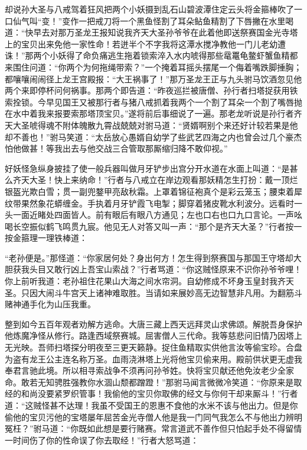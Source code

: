 \documentclass[12pt,UTF8]{ctexbook}
\begin{document}
却说孙大圣与八戒驾着狂风把两个小妖摄到乱石山碧波潭住定云头将金箍棒吹了一口仙气叫“变！”变作一把戒刀将一个黑鱼怪割了耳朵鲇鱼精割了下唇撇在水里喝道：“快早去对那万圣龙王报知说我齐天大圣孙爷爷在此着他即送祭赛国金光寺塔上的宝贝出来免他一家性命！若迸半个不字我将这潭水搅净教他一门儿老幼遭诛！”那两个小妖得了命负痛逃生拖着锁索淬入水内唬得那些鼋鼍龟鳖虾蟹鱼精都来围住问道：“你两个为何拖绳带索？”一个掩着耳摇头摆尾一个侮着嘴跌脚捶胸；都嚷嚷闹闹径上龙王宫殿报：“大王祸事了！”那万圣龙王正与九头驸马饮酒忽见他两个来即停杯问何祸事。那两个即告道：“昨夜巡拦被唐僧、孙行者扫塔捉获用铁索拴锁。今早见国王又被那行者与猪八戒抓着我两个一个割了耳朵一个割了嘴唇抛在水中着我来报要索那塔顶宝贝。”遂将前后事细说了一遍。那老龙听说是孙行者齐天大圣唬得魂不附体魄散九霄战兢兢对驸马道：“贤婿啊别个来还好计较若果是他却不善也！”驸马笑道：“太岳放心愚婿自幼学了些武艺四海之内也曾会过几个豪杰怕他做甚！等我出去与他交战三合管取那厮缩归降不敢仰视。”

好妖怪急纵身披挂了使一般兵器叫做月牙铲步出宫分开水道在水面上叫道：“是甚么齐天大圣！快上来纳命！”行者与八戒立在岸边观看那妖精怎生打扮：戴一顶烂银盔光欺白雪；贯一副兜鍪甲亮敌秋霜。上罩着锦征袍真个是彩云笼玉；腰束着犀纹带果然象花蟒缠金。手执着月牙铲霞飞电掣；脚穿着猪皮靴水利波分。远看时一头一面近睹处四面皆人。前有眼后有眼八方通见；左也口右也口九口言论。一声吆喝长空振似鹤飞鸣贯九宸。他见无人对答又叫一声：“那个是齐天大圣？”行者按一按金箍理一理铁棒道：

“老孙便是。”那怪道：“你家居何处？身出何方！怎生得到祭赛国与那国王守塔却大胆获我头目又敢行凶上吾宝山索战？”行者骂道：“你这贼怪原来不识你孙爷爷哩！你上前听我道：老孙祖住花果山大海之间水帘洞。自幼修成不坏身玉皇封我齐天圣。只因大闹斗牛宫天上诸神难取胜。当请如来展妙高无边智慧非凡用。为翻筋斗赌神通手化为山压我重。

整到如今五百年观者劝解方逃命。大唐三藏上西天远拜灵山求佛颂。解脱吾身保护他炼魔净怪从修行。路逢西域祭赛城。屈害僧人三代命。我等慈悲问旧情乃因塔上无光映。吾师扫塔探分明夜至三更天籁静。捉住鱼精取实供他言汝等偷宝珍。合盘为盗有龙王公主连名称万圣。血雨浇淋塔上光将他宝贝偷来用。殿前供状更无虚我奉君言驰此境。所以相寻索战争不须再问孙爷姓。快将宝贝献还他免汝老少全家命。敢若无知骋胜强教你水涸山颓都蹭蹬！”那驸马闻言微微冷笑道：“你原来是取经的和尚没要紧罗织管事！我偷他的宝贝你取佛的经文与你何干却来厮斗！”行者道：“这贼怪甚不达理！我虽不受国王的恩惠不食他的水米不该与他出力。但是你偷他的宝贝污他的宝塔屡年屈苦金光寺僧人他是我一门同气我怎么不与他出力辨明冤枉？”驸马道：“你既如此想是要行赌赛。常言道武不善作但只怕起手处不得留情一时间伤了你的性命误了你去取经！”行者大怒骂道：
\end{document}

